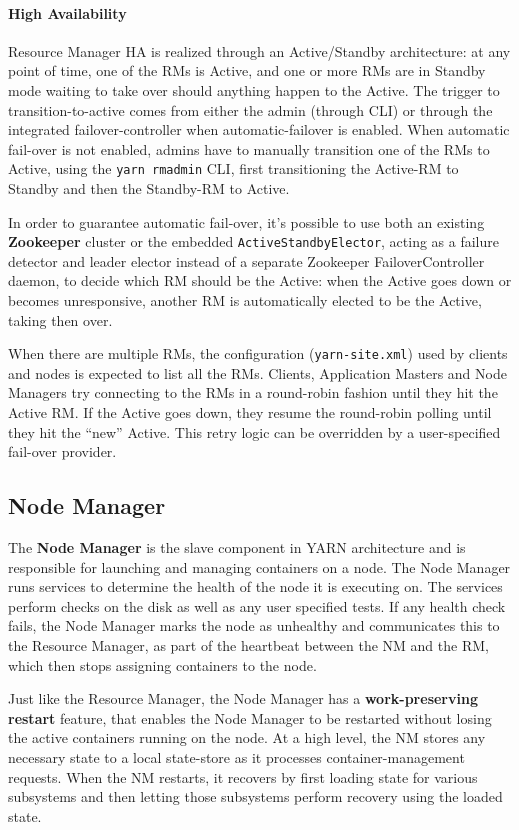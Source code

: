 \paragraph{High Availability} Resource Manager HA is realized through an Active/Standby architecture: at any point of time, one of the RMs is Active, and one or more RMs are in Standby mode waiting to take over should anything happen to the Active. The trigger to transition-to-active comes from either the admin (through CLI) or through the integrated failover-controller when automatic-failover is enabled. When automatic fail-over is not enabled, admins have to manually transition one of the RMs to Active, using the \verb|yarn rmadmin| CLI, first transitioning the Active-RM to Standby and then the Standby-RM to Active.

In order to guarantee automatic fail-over, it's possible to use both an existing \textbf{Zookeeper} cluster or the embedded \verb|ActiveStandbyElector|, acting as a failure detector and leader elector instead of a separate Zookeeper FailoverController daemon, to decide which RM should be the Active: when the Active goes down or becomes unresponsive, another RM is automatically elected to be the Active, taking then over.

When there are multiple RMs, the configuration (\verb|yarn-site.xml|) used by clients and nodes is expected to list all the RMs. Clients, Application Masters and Node Managers try connecting to the RMs in a round-robin fashion until they hit the Active RM. If the Active goes down, they resume the round-robin polling until they hit the “new” Active. This retry logic can be overridden by a user-specified fail-over provider.

\subsection{Node Manager}

The \textbf{Node Manager} is the slave component in YARN architecture and is responsible for launching and managing containers on a node. The Node Manager runs services to determine the health of the node it is executing on. The services perform checks on the disk as well as any user specified tests. If any health check fails, the Node Manager marks the node as unhealthy and communicates this to the Resource Manager, as part of the heartbeat between the NM and the RM, which then stops assigning containers to the node.

Just like the Resource Manager, the Node Manager has a \textbf{work-preserving restart} feature, that enables the Node Manager to be restarted without losing the active containers running on the node. At a high level, the NM stores any necessary state to a local state-store as it processes container-management requests. When the NM restarts, it recovers by first loading state for various subsystems and then letting those subsystems perform recovery using the loaded state. 

